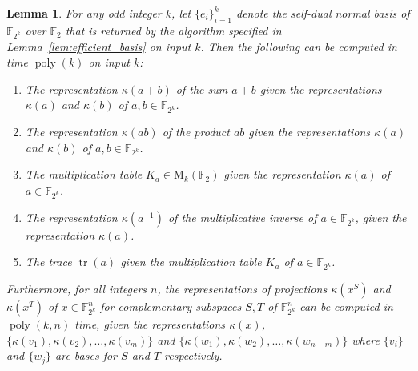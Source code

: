 \documentclass[11pt]{article}
\newtheorem{lemma}[theorem]{Lemma}
\theoremstyle{definition}
\newcommand{\F}{\ensuremath{\mathbb{F}}}
\newcommand{\downsize}{\kappa}
\DeclareMathOperator{\poly}{poly}
\DeclareMathOperator{\tr}{tr}
\newcommand{\Matrix}{\mathrm{M}}
\begin{document}
\begin{lemma}
  \label{lem:efficient_arithmetic}
  For any odd integer $k$, let $\{e_i\}_{i=1}^k$ denote the self-dual normal basis
  of $\F_{2^k}$ over $\F_2$ that is returned by the algorithm specified in
  Lemma~\ref{lem:efficient_basis} on input $k$.
  Then the following can be computed in time $\poly(k)$ on input $k$:
  \begin{enumerate}
  \item The representation $\downsize(a+b)$ of the sum $a+b$ given the
    representations $\downsize(a)$ and $\downsize(b)$ of $a, b \in \F_{2^k}$.
	\item The representation $\downsize(ab)$ of the product $ab$ given the
    representations $\downsize(a)$ and $\downsize(b)$ of $a, b \in \F_{2^k}$.
  \item The multiplication table $K_a \in \Matrix_k(\F_2)$ given the
    representation $\downsize(a)$ of  $a\in \F_{2^k}$.
  \item The representation $\downsize(a^{-1})$ of the multiplicative inverse of
    $a \in \F_{2^k}$, given the representation $\downsize(a)$.
	\item The trace $\tr(a)$ given the multiplication table $K_a$ of $a \in \F_{2^k}$.
  \end{enumerate}
  Furthermore, for all integers $n$, the representations of projections
  $\downsize(x^S)$ and $\downsize(x^T)$ of $x \in \F_{2^k}^n$ for complementary
  subspaces $S,T$ of $\F_{2^k}^n$ can be computed in $\poly(k,n)$ time, given
  the representations $\downsize(x)$, $\{\downsize(v_1), \downsize(v_2), \ldots,
  \downsize(v_m)\}$ and $\{\downsize(w_1), \downsize(w_2), \ldots,
  \downsize(w_{n - m})\}$ where $\{v_i\}$ and $\{w_j\}$ are bases for $S$ and
  $T$ respectively.
\end{lemma}
\end{document}
